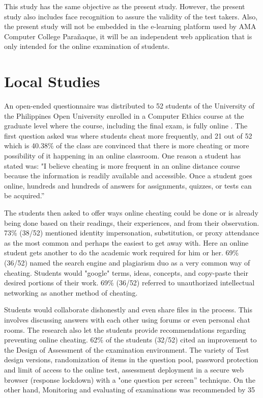 This study has the same objective as the present study. However, the present study also includes face recognition to assure the validity of the test takers.
Also, the present study will not be embedded in the e-learning platform used by AMA Computer College Parañaque, it will be an independent web application that is only intended for the online examination of students.

\section{Local Studies}

An open-ended questionnaire was distributed to 52 students of the University of the Philippines Open University enrolled in a Computer Ethics course at the graduate level where the course, including the final exam, is fully online \cite{ravasco2012technology}.
The first question asked was where students cheat more frequently, and 21 out of 52 which is 40.38\% of the class are convinced that there is more cheating or more possibility of it happening in an online classroom.
One reason a student has stated was: "I believe cheating is more frequent in an online distance course because the information is readily available and accessible.
Once a student goes online, hundreds and hundreds of answers for assignments, quizzes, or tests can be acquired.”

The students then asked to offer ways online cheating could be done or is already being done based on their readings, their experiences, and from their observation.
73\% (38/52) mentioned identity impersonation, substitution, or proxy attendance as the most common and perhaps the easiest to get away with.
Here an online student gets another to do the academic work required for him or her.
69\% (36/52) named the search engine and plagiarism duo as a very common way of cheating.
Students would "google" terms, ideas, concepts, and copy-paste their desired portions of their work.
69\% (36/52) referred to unauthorized intellectual networking as another method of cheating.

Students would collaborate dishonestly and even share files in the process.
This involves discussing answers with each other using forums or even personal chat rooms.
The research also let the students provide recommendations regarding preventing online cheating.
62\% of the students (32/52) cited an improvement to the Design of Assessment of the examination environment.
The variety of Test design versions, randomization of items in the question pool, password protection and limit of access to the online test, assessment deployment in a secure web browser (response lockdown) with a "one question per screen” technique.
On the other hand, Monitoring and evaluating of examinations was recommended by 35%

